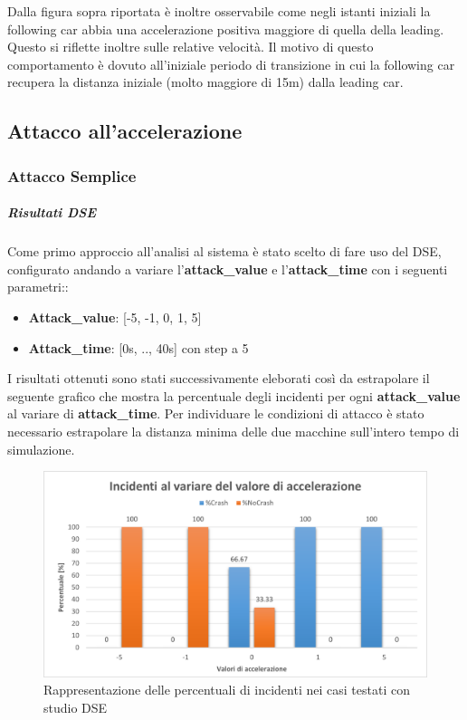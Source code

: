 Dalla figura sopra riportata è inoltre osservabile come negli istanti iniziali la following car abbia una accelerazione positiva maggiore di quella della leading. Questo si riflette inoltre sulle relative velocità. Il motivo di questo comportamento è dovuto all'iniziale periodo di transizione in cui la following car recupera la distanza iniziale (molto maggiore di 15m) dalla leading car. 

\subsection{Attacco all'accelerazione}
\subsubsection{Attacco Semplice}
\subparagraph{Risultati DSE}
Come primo approccio all'analisi al sistema è stato scelto di fare uso del DSE, configurato andando a variare l'\textbf{attack\_value} e l'\textbf{attack\_time} con i seguenti parametri::
\begin{itemize}
	\item \textbf{Attack\_value}: [-5, -1, 0, 1, 5]
	\item \textbf{Attack\_time}: [0s, .., 40s] con step a 5
\end{itemize}
I risultati ottenuti sono stati successivamente eleborati così da estrapolare il seguente grafico che mostra la percentuale degli incidenti per ogni \textbf{attack\_value} al variare di \textbf{attack\_time}. Per individuare le condizioni di attacco è stato necessario estrapolare la distanza minima delle due macchine sull'intero tempo di simulazione.

\begin{figure}[H]
	\centering
	\includegraphics[width=\textwidth]{img/PlotPercentageIncidenteAttackAccel.png}
	\caption{Rappresentazione delle percentuali di incidenti nei casi testati con studio DSE}
\end{figure}


